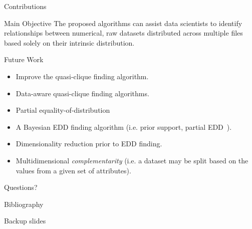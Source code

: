 \documentclass[10pt]{beamer}
\begin{document}
\begin{frame}{Contributions}

\begin{block}{ Main Objective}
    The proposed algorithms can assist data scientists to identify relationships
    between numerical, raw datasets distributed across multiple files
    based solely on their intrinsic distribution.
\end{block}

\end{frame}


\begin{frame}{Future Work}
    \begin{itemize}
        \item Improve the quasi-clique finding algorithm.
                
        \item Data-aware quasi-clique finding algorithms.
        
        \item \alert{Partial equality-of-distribution}
                
        \item A Bayesian EDD finding algorithm (i.e. prior support, partial EDD~\cite{soriano2015bayesian}).
        
        \item Dimensionality reduction prior to EDD finding.
            
        \item \alert{Multidimensional \emph{complementarity}} (i.e. a dataset may be split 
        based on the values from a given set of attributes).
    \end{itemize}
\end{frame}

{
\begin{frame}[standout]
  \huge Questions?
\end{frame}
}


\begin{frame}[allowframebreaks]{Bibliography}
\printbibliography[]
\end{frame}

\appendix

{
\begin{frame}[standout]
  Backup slides
\end{frame}
}
\end{document}
